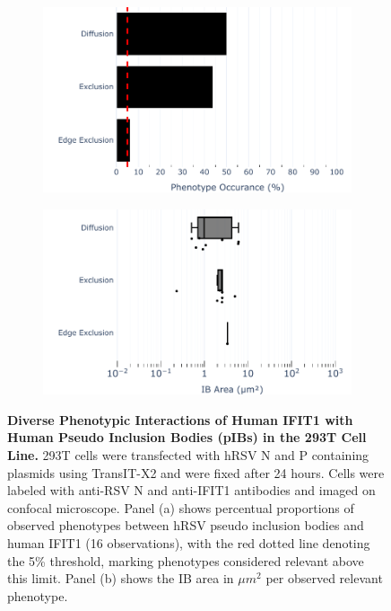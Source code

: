 \begin{figure}
    \begin{subfigure}{0.495\textwidth}
        \caption{}
        \includegraphics[width=1\linewidth]{08. Chapter 3/Figs/03. pIB/02. IFIT1/01. bar_i1_293t.pdf} 
    \end{subfigure}
    \begin{subfigure}{0.495\textwidth}
        \caption{}
        \includegraphics[width=1\linewidth]{08. Chapter 3/Figs/03. pIB/02. IFIT1/02. box_i1_293t.pdf}
    \end{subfigure}
    \caption[Diverse Phenotypic Interactions of Human IFIT1 with Human Pseudo Inclusion Bodies (pIBs) in the 293T Cell Line.]{\textbf{Diverse Phenotypic Interactions of Human IFIT1 with Human Pseudo Inclusion Bodies (pIBs) in the 293T Cell Line.} 293T cells were transfected with hRSV N and P containing plasmids using TransIT-X2 and were fixed after 24 hours. Cells were labeled with anti-RSV N and anti-IFIT1 antibodies and imaged on confocal microscope. Panel (a) shows percentual proportions of observed phenotypes between hRSV pseudo inclusion bodies and human IFIT1 (16 observations), with the red dotted line denoting the 5\% threshold, marking phenotypes considered relevant above this limit. Panel (b) shows the IB area in \(\mu m^2\) per observed relevant phenotype.}
    \label{fig:Diverse Phenotypic Interactions of Human IFIT1 with Human Pseudo Inclusion Bodies (pIBs) in the 293T Cell Line}
\end{figure}

